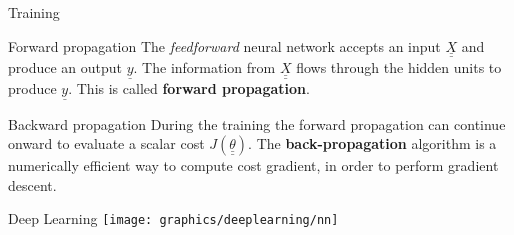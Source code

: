     \begin{frame}{Training}
        \begin{block}{Forward propagation}
            The \emph{feedforward} neural network accepts an input $\underline{\underline{X}}$ and produce an output $\underline{y}$. The information from $\underline{\underline{X}}$ flows through the hidden units to produce $\underline{y}$. This is called \textbf{forward propagation}.
        \end{block}

        \begin{block}{Backward propagation}
            During the training the forward propagation can continue onward to evaluate a scalar cost $J\left(\underline{\underline{\theta}}\right)$. The \textbf{back-propagation} algorithm is a numerically efficient way to compute cost gradient, in order to perform gradient descent.
        \end{block}    
    \end{frame}

    \begin{frame}{Deep Learning}
        \texttt{[image: graphics/deeplearning/nn]}
    \end{frame}

